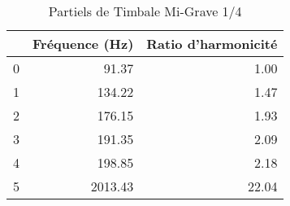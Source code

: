 \begin{table}
\centering
\caption{Partiels de Timbale Mi-Grave 1/4}
\label{table:partiels-timbale-migrave-1.wav}
\begin{tabular}{lrr}
\toprule
{} &  Fréquence (Hz) &  Ratio d'harmonicité \\
\midrule
0 &           91.37 &                 1.00 \\
1 &          134.22 &                 1.47 \\
2 &          176.15 &                 1.93 \\
3 &          191.35 &                 2.09 \\
4 &          198.85 &                 2.18 \\
5 &         2013.43 &                22.04 \\
\bottomrule
\end{tabular}
\end{table}

